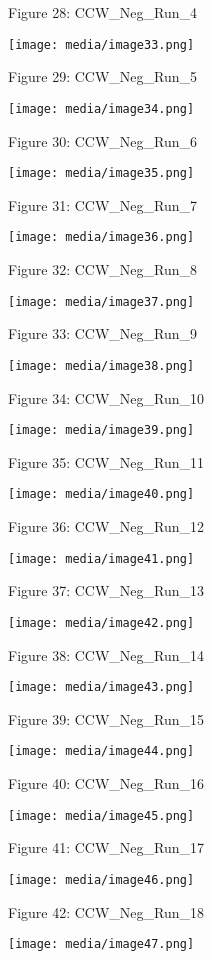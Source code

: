 \documentclass[SE,lsstdraft,authoryear,toc]{lsstdoc}
\begin{document}
Figure 28: CCW\_Neg\_Run\_4

\texttt{[image: media/image33.png]}

Figure 29: CCW\_Neg\_Run\_5

\texttt{[image: media/image34.png]}

Figure 30: CCW\_Neg\_Run\_6

\texttt{[image: media/image35.png]}

Figure 31: CCW\_Neg\_Run\_7

\texttt{[image: media/image36.png]}

Figure 32: CCW\_Neg\_Run\_8

\texttt{[image: media/image37.png]}

Figure 33: CCW\_Neg\_Run\_9

\texttt{[image: media/image38.png]}

Figure 34: CCW\_Neg\_Run\_10

\texttt{[image: media/image39.png]}

Figure 35: CCW\_Neg\_Run\_11

\texttt{[image: media/image40.png]}

Figure 36: CCW\_Neg\_Run\_12

\texttt{[image: media/image41.png]}

Figure 37: CCW\_Neg\_Run\_13

\texttt{[image: media/image42.png]}

Figure 38: CCW\_Neg\_Run\_14

\texttt{[image: media/image43.png]}

Figure 39: CCW\_Neg\_Run\_15

\texttt{[image: media/image44.png]}

Figure 40: CCW\_Neg\_Run\_16

\texttt{[image: media/image45.png]}

Figure 41: CCW\_Neg\_Run\_17

\texttt{[image: media/image46.png]}

Figure 42: CCW\_Neg\_Run\_18

\texttt{[image: media/image47.png]}
\end{document}
